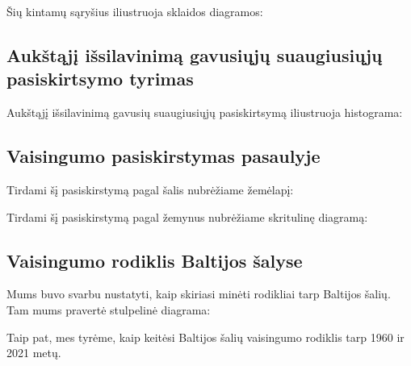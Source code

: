 Šių kintamų sąryšius iliustruoja sklaidos diagramos:
\begin{multicols}{2}
\end{multicols}

\subsection{Aukštąjį išsilavinimą gavusiųjų suaugiusiųjų pasiskirtsymo tyrimas} 

Aukštąjį išsilavinimą gavusių suaugiusiųjų pasiskirtsymą iliustruoja histograma:

\subsection{Vaisingumo pasiskirstymas pasaulyje}
Tirdami šį pasiskirstymą pagal šalis nubrėžiame žemėlapį:

Tirdami šį pasiskirstymą pagal žemynus nubrėžiame skritulinę diagramą:

\subsection{Vaisingumo rodiklis Baltijos šalyse}
Mums buvo svarbu nustatyti, kaip skiriasi minėti rodikliai tarp Baltijos šalių.
Tam mums pravertė stulpelinė diagrama:

Taip pat, mes tyrėme, kaip keitėsi Baltijos šalių vaisingumo rodiklis tarp 1960 ir 2021 metų.

